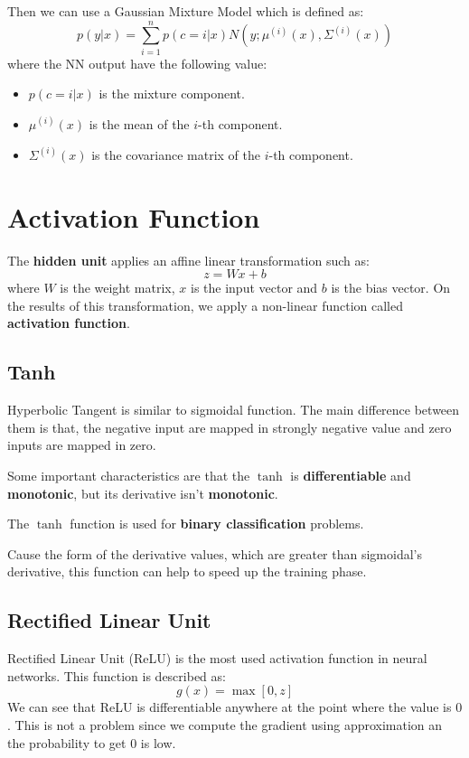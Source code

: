 Then we can use a Gaussian Mixture Model which is defined as:
\begin{equation}
    p(y|x) = \sum_{i=1}^n p(c= i|x) N(y; \mu^{(i)}(x), \Sigma^{(i)}(x))
\end{equation}
where the NN output have the following value:
\begin{itemize}
    \item $p(c=i|x)$ is the mixture component.
    \item $\mu^{(i)}(x)$ is the mean of the $i$-th component.
    \item $\Sigma^{(i)}(x)$ is the covariance matrix of the $i$-th component.
\end{itemize}
\section{Activation Function}
The \textbf{hidden unit} applies an affine linear transformation such as:
\begin{equation}
    z = Wx + b
\end{equation}
where $W$ is the weight matrix, $x$ is the input vector and $b$ is the bias vector.
On the results of this transformation, we apply a non-linear function called
\textbf{activation function}.

\subsection{Tanh}
Hyperbolic Tangent is similar to sigmoidal function. The main difference between
them is that, the negative input are mapped in strongly negative value and zero
inputs are mapped in zero.

Some important characteristics are that the $\tanh$ is \textbf{differentiable}
and \textbf{monotonic}, but its derivative isn't \textbf{monotonic}.
\begin{note}
    The $\tanh$ function is used for \textbf{binary classification} problems.
\end{note}

Cause the form of the derivative values, which are greater than sigmoidal's derivative,
this function can help to speed up the training phase.
\subsection{Rectified Linear Unit}
Rectified Linear Unit (ReLU) is the most used activation function in neural networks.
This function is described as:
\begin{equation}
    g(x) = \max[0,z]
\end{equation}
We can see that ReLU is differentiable anywhere at the point where the value is
$0$. This is not a problem since we compute the gradient using approximation an
the probability to get $0$ is low.

